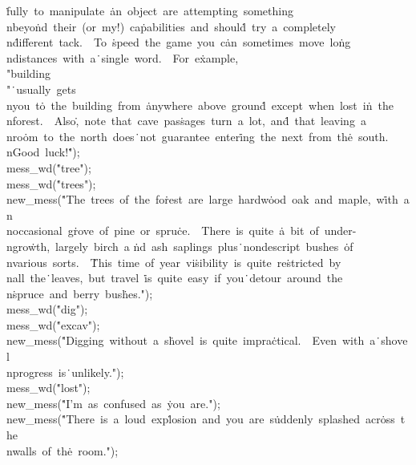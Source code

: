 \.{fully\ to\ manipulate\ }\)\.{an\ object\ are\ attemp}\)\.{ting\ something\\nbeyo}\)\.{nd\ their\ (or\ my!)\ ca}\)\.{pabilities\ and\ shoul}\)\.{d\ try\ a\ completely\\n}\)\.{different\ tack.\ \ To\ }\)\.{speed\ the\ game\ you\ c}\)\.{an\ sometimes\
move\ lo}\)\.{ng\\ndistances\ with\ a}\)\.{\ single\ word.\ \ For\ e}\)\.{xample,\ \\"building\\"}\)\.{\ usually\ gets\\nyou\ t}\)\.{o\ the\ building\ from\ }\)\.{anywhere\ above\ groun}\)\.{d\ except\ when\ lost\ i}\)\.{n\ the\\nforest.\ \ Also}\)\.{,\
note\ that\ cave\ pas}\)\.{sages\ turn\ a\ lot,\ an}\)\.{d\ that\ leaving\ a\\nro}\)\.{om\ to\ the\ north\ does}\)\.{\ not\ guarantee\ enter}\)\.{ing\ the\ next\ from\ th}\)\.{e\ south.\\nGood\ luck!}\)\.{"});\6
\\{mess\_wd}(\.{"tree"});\6
\\{mess\_wd}(\.{"trees"});\6
\\{new\_mess}(\.{"The\ trees\ of\ the\ fo}\)\.{rest\ are\ large\ hardw}\)\.{ood\ oak\ and\ maple,\ w}\)\.{ith\ an\\noccasional\ g}\)\.{rove\ of\ pine\ or\ spru}\)\.{ce.\ \ There\ is\ quite\ }\)\.{a\ bit\ of\ under-\\ngro}\)\.{wth,\ largely\ birch\ a}\)%
\.{nd\ ash\ saplings\ plus}\)\.{\ nondescript\ bushes\ }\)\.{of\\nvarious\ sorts.\ \ }\)\.{This\ time\ of\ year\ vi}\)\.{sibility\ is\ quite\ re}\)\.{stricted\ by\\nall\ the}\)\.{\ leaves,\ but\ travel\ }\)\.{is\ quite\ easy\ if\ you}\)\.{\ detour\
around\ the\\n}\)\.{spruce\ and\ berry\ bus}\)\.{hes."});\6
\\{mess\_wd}(\.{"dig"});\6
\\{mess\_wd}(\.{"excav"});\6
\\{new\_mess}(\.{"Digging\ without\ a\ s}\)\.{hovel\ is\ quite\ impra}\)\.{ctical.\ \ Even\ with\ a}\)\.{\ shovel\\nprogress\ is}\)\.{\ unlikely."});\6
\\{mess\_wd}(\.{"lost"});\6
\\{new\_mess}(\.{"I'm\ as\ confused\ as\ }\)\.{you\ are."});\6
\\{new\_mess}(\.{"There\ is\ a\ loud\ exp}\)\.{losion\ and\ you\ are\ s}\)\.{uddenly\ splashed\ acr}\)\.{oss\ the\\nwalls\ of\ th}\)\.{e\ room."});\6
